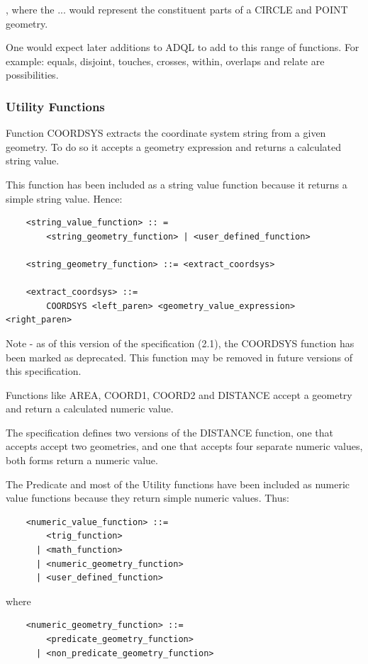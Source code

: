 \documentclass[11pt,a4paper]{ivoa}
\begin{document}
, where the ... would represent the constituent parts of a CIRCLE and POINT
geometry.

One would expect later additions to ADQL to add to this range of functions. For
example: equals, disjoint, touches, crosses, within, overlaps and relate
are possibilities.

\subsubsection{Utility Functions}
\label{sec:functions.geom.utility}

Function COORDSYS extracts the coordinate system string from a given
geometry. To do so it accepts a geometry expression and returns a calculated
string value.

This function has been included as a string value function because it
returns a simple string value. Hence:

\begin{verbatim}
    <string_value_function> :: =
        <string_geometry_function> | <user_defined_function>

    <string_geometry_function> ::= <extract_coordsys>

    <extract_coordsys> ::=
        COORDSYS <left_paren> <geometry_value_expression> <right_paren>
\end{verbatim}

Note - as of this version of the specification (2.1), the COORDSYS function has
been marked as deprecated. This function may be removed in future versions
of this specification.

Functions like AREA, COORD1, COORD2 and DISTANCE accept a geometry and
return a calculated numeric value.

The specification defines two versions of the DISTANCE function,
one that accepts accept two geometries, and one that accepts four
separate numeric values, both forms return a numeric value.

The Predicate and most of the Utility functions have been included as numeric
value functions because they return simple numeric values. Thus:

\begin{verbatim}
    <numeric_value_function> ::=
        <trig_function>
      | <math_function>
      | <numeric_geometry_function>
      | <user_defined_function>
\end{verbatim}

where

\begin{verbatim}
    <numeric_geometry_function> ::=
        <predicate_geometry_function>
      | <non_predicate_geometry_function>
\end{verbatim}
\end{document}
